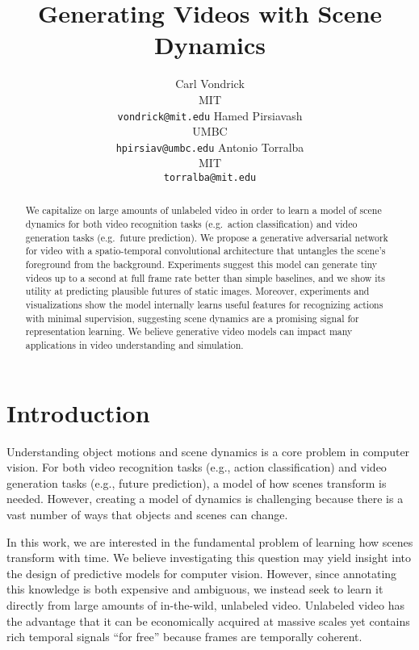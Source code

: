 \documentclass{article}
\title{Generating Videos with Scene Dynamics}
\author{
Carl Vondrick \\
MIT \\
\texttt{vondrick@mit.edu}
\And
Hamed Pirsiavash \\
UMBC \\
\texttt{hpirsiav@umbc.edu}
\And
Antonio Torralba \\
MIT \\
\texttt{torralba@mit.edu}
}
\begin{document}
\maketitle

\begin{abstract}



We capitalize on large amounts of unlabeled video in order to learn a  model of scene dynamics for both video recognition tasks (e.g.\ action classification) and video generation tasks (e.g.\ future prediction). We propose a generative adversarial network for video with a spatio-temporal convolutional architecture that untangles the scene's foreground from the background. Experiments suggest this model can generate tiny videos up to a second at full frame rate better than simple baselines, and we show its utility at predicting plausible futures of static images. Moreover, experiments and visualizations show the model internally learns useful features for recognizing actions with minimal supervision, suggesting scene dynamics are a promising signal for representation learning. We believe generative video models can impact many applications in video understanding and simulation.


\end{abstract}


\section{Introduction} 

Understanding object motions and scene dynamics is a core problem in computer vision. For both video recognition tasks (e.g., action classification)
and video generation tasks (e.g., future prediction),
a model of how scenes transform is needed.
However, creating a model of dynamics is challenging  because there is a vast number of ways that objects and scenes can change.

In this work, we are interested in the fundamental problem of learning how scenes transform with time. We believe investigating this question may yield insight into the design of predictive models for computer vision. However, since annotating this knowledge is both expensive and ambiguous, we instead seek to learn it directly from large amounts of in-the-wild, unlabeled video. Unlabeled video has the advantage that it can be economically acquired at massive scales yet contains rich temporal signals ``for free'' because frames are temporally coherent. 
\end{document}

